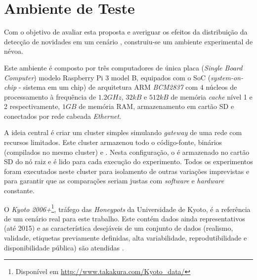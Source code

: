 
\section{Ambiente de Teste}\label{sec:ambiente}

Com o objetivo de avaliar esta proposta e averiguar os efeitos da distribuição
da detecção de novidades em um cenário \iot, construiu-se um ambiente
experimental de névoa.

Este ambiente é composto por três computadores de única placa (\emph{Single
Board Computer}) modelo Raspberry Pi 3 model B, equipados com o SoC
(\emph{system-on-chip} - sistema em um chip) de arquitetura ARM \emph{BCM2837} com
$4$ núcleos de processamento à frequência de $1.2GHz$, $32kB$ e $512kB$ de
memória \emph{cache} nível 1 e 2 respectivamente, $1GB$ de memória RAM,
armazenamento em cartão SD e conectados por rede cabeada \emph{Ethernet}.

A ideia central é criar um cluster simples simulando \emph{gateway} de uma rede
\iot com recursos limitados.
Este cluster armazenou todo o código-fonte, binários (compilados no mesmo cluster) e
\dataset.
Nesta configuração, o \dataset é armazenado no cartão SD do nó raiz e é lido para
cada execução do experimento.
Todos os experimentos foram executados neste cluster para isolamento de outras
variações imprevistas e para garantir que as comparações seriam justas com
\emph{software} e \emph{hardware} constante.


O \dataset \emph{Kyoto 2006+}\footnote{Disponível em
\url{http://www.takakura.com/Kyoto\_data/}}, tráfego das \emph{Honeypots} da
Universidade de Kyoto, é a referência de um cenário real para este trabalho.
Este \dataset contém dados ainda representativos (até 2015) e as característica
desejáveis de um conjunto de dados (realismo, validade, etiquetas previamente
definidas, alta variabilidade, reprodutibilidade e disponibilidade pública) são
atendidas \cite{KyotoDataset,Song2011kyoto}.

